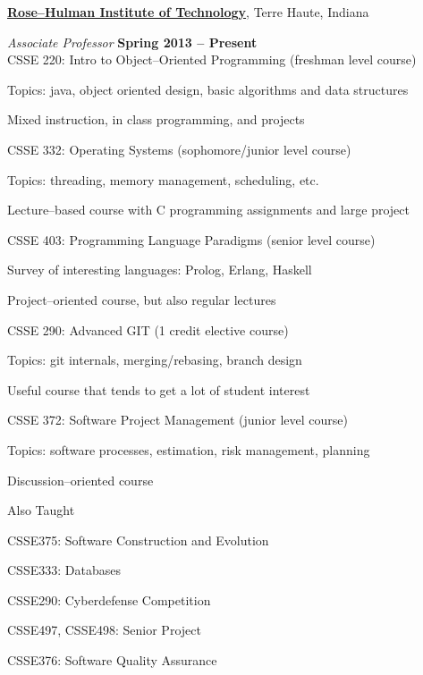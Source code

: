 \documentclass[10pt]{article}
\newenvironment{outerlist}[1][\enskip\textbullet]%
        {\begin{itemize}[#1]}{\end{itemize}%
         \vspace{-.6\baselineskip}}
\newenvironment{innerlist}[1][\enskip\textbullet]%
        {\begin{compactitem}[#1]}{\end{compactitem}}
\begin{document}
\href{http://www.rose-hulman.edu}{\textbf{Rose--Hulman Institute of Technology}},
Terre Haute, Indiana
\begin{outerlist}
\item[] \textit{Associate Professor}%
    \hfill \textbf{Spring 2013 -- Present}\\

    CSSE 220: Intro to Object--Oriented Programming (freshman level course)
    \begin{innerlist}
    \item Topics: java, object oriented design, basic algorithms and data structures
    \item Mixed instruction, in class programming, and projects
    \end{innerlist}

    CSSE 332: Operating Systems (sophomore/junior level course)
    \begin{innerlist}
    \item Topics: threading, memory management, scheduling, etc.
    \item Lecture--based course with C programming assignments and large project
    \end{innerlist}
    
    CSSE 403: Programming Language Paradigms (senior level course)
    \begin{innerlist}
    \item Survey of interesting languages: Prolog, Erlang, Haskell
    \item Project--oriented course, but also regular lectures
    \end{innerlist}

    CSSE 290: Advanced GIT (1 credit elective course)
    \begin{innerlist}
    \item Topics: git internals, merging/rebasing, branch design
    \item Useful course that tends to get a lot of student interest
    \end{innerlist}
    
    CSSE 372: Software Project Management (junior level course)
    \begin{innerlist}
    \item Topics: software processes, estimation, risk management, planning
    \item Discussion--oriented course
    \end{innerlist}

    Also Taught
    \begin{innerlist}
    \item CSSE375: Software Construction and Evolution
    \item CSSE333: Databases 
    \item CSSE290: Cyberdefense Competition
    \item CSSE497, CSSE498: Senior Project
    \item CSSE376: Software Quality Assurance
    \end{innerlist}


\end{outerlist}
\end{document}
